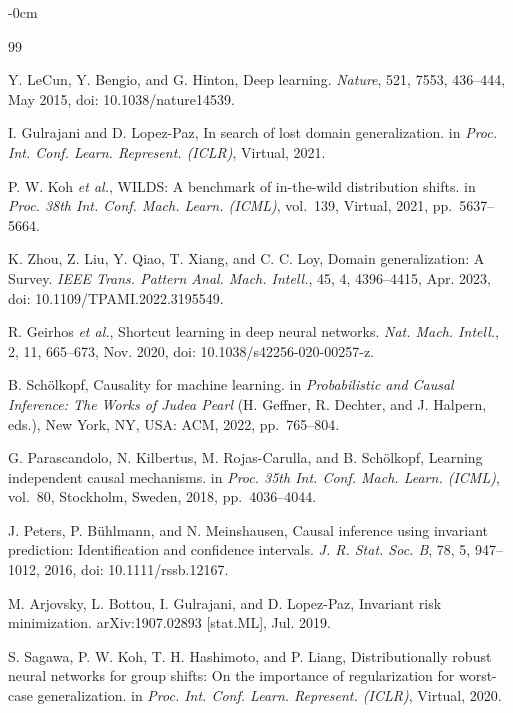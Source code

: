 \documentclass[electronics,article,submit,moreauthors]{Definitions/mdpi}
\begin{document}
\begin{adjustwidth}{-\extralength}{0cm}

\begin{thebibliography}{99}

Y. LeCun, Y. Bengio, and G. Hinton, Deep learning. \emph{Nature}, 521, 7553, 436--444, May 2015, doi: 10.1038/nature14539.


I. Gulrajani and D. Lopez-Paz, In search of lost domain generalization. in \emph{Proc. Int. Conf. Learn. Represent. (ICLR)}, Virtual, 2021.


P. W. Koh \emph{et al.}, WILDS: A benchmark of in-the-wild distribution shifts. in \emph{Proc. 38th Int. Conf. Mach. Learn. (ICML)}, vol.~139, Virtual, 2021, pp.~5637--5664.


K. Zhou, Z. Liu, Y. Qiao, T. Xiang, and C. C. Loy, Domain generalization: A Survey. \emph{IEEE Trans. Pattern Anal. Mach. Intell.}, 45, 4, 4396--4415, Apr. 2023, doi: 10.1109/TPAMI.2022.3195549.


R. Geirhos \emph{et al.}, Shortcut learning in deep neural networks. \emph{Nat. Mach. Intell.}, 2, 11, 665--673, Nov. 2020, doi: 10.1038/s42256-020-00257-z.


B. Sch\"olkopf, Causality for machine learning. in \emph{Probabilistic and Causal Inference: The Works of Judea Pearl} (H. Geffner, R. Dechter, and J. Halpern, eds.), New York, NY, USA: ACM, 2022, pp.~765--804.


G. Parascandolo, N. Kilbertus, M. Rojas-Carulla, and B. Sch\"olkopf, Learning independent causal mechanisms. in \emph{Proc. 35th Int. Conf. Mach. Learn. (ICML)}, vol.~80, Stockholm, Sweden, 2018, pp.~4036--4044.


J. Peters, P. B\"uhlmann, and N. Meinshausen, Causal inference using invariant prediction: Identification and confidence intervals. \emph{J. R. Stat. Soc. B}, 78, 5, 947--1012, 2016, doi: 10.1111/rssb.12167.


M. Arjovsky, L. Bottou, I. Gulrajani, and D. Lopez-Paz, Invariant risk minimization. arXiv:1907.02893 [stat.ML], Jul. 2019.


S. Sagawa, P. W. Koh, T. H. Hashimoto, and P. Liang, Distributionally robust neural networks for group shifts: On the importance of regularization for worst-case generalization. in \emph{Proc. Int. Conf. Learn. Represent. (ICLR)}, Virtual, 2020.



\end{thebibliography}
\end{adjustwidth}
\end{document}
